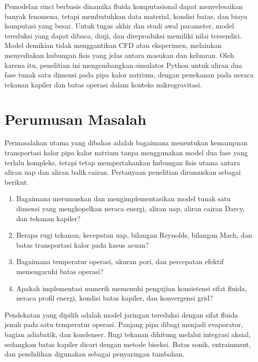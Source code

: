 \documentclass[
  12pt,
  12pt,a4paper,oneside]{report}
\providecommand{\tightlist}{%
  \setlength{\itemsep}{0pt}\setlength{\parskip}{0pt}}
\begin{document}
Pemodelan rinci berbasis dinamika fluida komputasional dapat
menyelesaikan banyak fenomena, tetapi membutuhkan data material, kondisi
batas, dan biaya komputasi yang besar. Untuk tugas akhir dan studi awal
parameter, model tereduksi yang dapat dibaca, diuji, dan direproduksi
memiliki nilai tersendiri. Model demikian tidak menggantikan CFD atau
eksperimen, melainkan menyediakan hubungan fisis yang jelas antara
masukan dan keluaran. Oleh karena itu, penelitian ini mengembangkan
simulator Python untuk aliran dua fase tunak satu dimensi pada pipa
kalor natrium, dengan penekanan pada neraca tekanan kapiler dan batas
operasi dalam konteks mikrogravitasi.

\hypertarget{perumusan-masalah}{%
\section{Perumusan Masalah}\label{perumusan-masalah}}

Permasalahan utama yang dibahas adalah bagaimana menentukan kemampuan
transportasi kalor pipa kalor natrium tanpa menggunakan model dua fase
yang terlalu kompleks, tetapi tetap mempertahankan hubungan fisis utama
antara aliran uap dan aliran balik cairan. Pertanyaan penelitian
dirumuskan sebagai berikut.

\begin{enumerate}
\def\labelenumi{\arabic{enumi}.}
\tightlist
\item
  Bagaimana merumuskan dan mengimplementasikan model tunak satu dimensi
  yang mengkopelkan neraca energi, aliran uap, aliran cairan Darcy, dan
  tekanan kapiler?
\item
  Berapa rugi tekanan, kecepatan uap, bilangan Reynolds, bilangan Mach,
  dan batas transportasi kalor pada kasus acuan?
\item
  Bagaimana temperatur operasi, ukuran pori, dan percepatan efektif
  memengaruhi batas operasi?
\item
  Apakah implementasi numerik memenuhi pengujian konsistensi sifat
  fluida, neraca profil energi, kondisi batas kapiler, dan konvergensi
  grid?
\end{enumerate}

Pendekatan yang dipilih adalah model jaringan tereduksi dengan sifat
fluida jenuh pada satu temperatur operasi. Panjang pipa dibagi menjadi
evaporator, bagian adiabatik, dan kondenser. Rugi tekanan dihitung
melalui integrasi aksial, sedangkan batas kapiler dicari dengan metode
biseksi. Batas sonik, entrainment, dan pendidihan digunakan sebagai
penyaringan tambahan.
\end{document}
